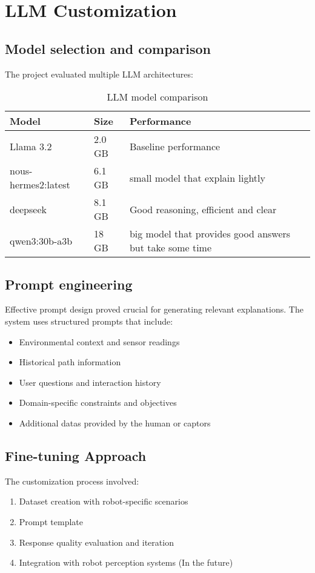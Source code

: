 \section{LLM Customization}

\subsection{Model selection and comparison}

The project evaluated multiple LLM architectures:

\begin{table}[ht]
\centering
\begin{tabular}{|l|l|l|}
\hline
\textbf{Model} & \textbf{Size} & \textbf{Performance} \\
\hline
Llama 3.2           & 2.0 GB    & Baseline performance \\
nous-hermes2:latest & 6.1 GB    & small model that explain lightly \\
deepseek            & 8.1 GB    & Good reasoning, efficient and clear\\
qwen3:30b-a3b       & 18 GB     & big model that provides good answers but take some time \\
\hline
\end{tabular}
\caption{LLM model comparison}
\end{table}

\subsection{Prompt engineering}

Effective prompt design proved crucial for generating relevant explanations. The system uses structured prompts that include:
\begin{itemize}
    \item Environmental context and sensor readings
    \item Historical path information
    \item User questions and interaction history
    \item Domain-specific constraints and objectives
    \item Additional datas provided by the human or captors
\end{itemize}

\subsection{Fine-tuning Approach}

The customization process involved:
\begin{enumerate}
    \item Dataset creation with robot-specific scenarios
    \item Prompt template
    \item Response quality evaluation and iteration
    \item Integration with robot perception systems (In the future)
\end{enumerate}
